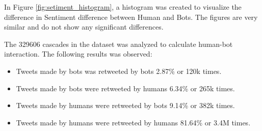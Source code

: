\documentclass[letterpaper]{article}
\begin{document}
In Figure \ref{fig:setiment_histogram}, a histogram was created to visualize the difference in Sentiment difference between Human and Bots. 
The figures are very similar and do not show any significant differences.\par


The 329606 cascades in the dataset was analyzed to calculate human-bot interaction. The following results was observed: 

\begin{itemize}
    \item Tweets made by bots was retweeted by bots 2.87\% or 120k times.
    \item Tweets made by bots were retweeted by humans 6.34\% or 265k times. 
    \item Tweets made by humans were retweeted by bots 9.14\% or 382k times. 
    \item Tweets made by humans were retweeted by humans 81.64\% or 3.4M times. 
\end{itemize}
\end{document}
